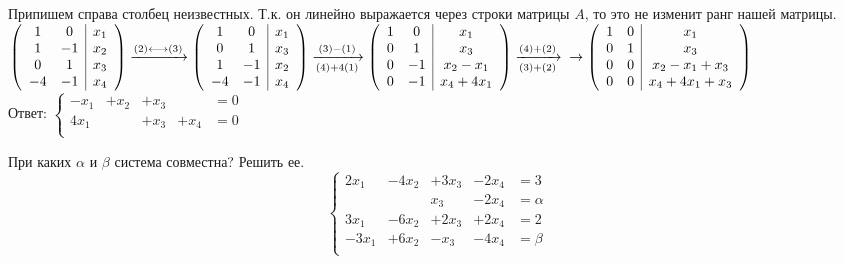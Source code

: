 \documentclass[a4paper,12pt]{article}
\newcounter{prim}
\newenvironment{prim}{%
	\addtocounter{prim}{1}
	\noindent{\\
	\textbf{\noindentПример \arabic{prim}\\}}%
	}{}
\begin{document}
Припишем справа столбец неизвестных. Т.к. он линейно выражается через строки матрицы $A$, то это не изменит ранг нашей матрицы.\\
$
\left( \begin{array}{cc|c}
1&0&x_1\\
1&-1&x_2\\
0&1&x_3\\
-4&-1&x_4\\
\end{array}\right)
\xrightarrow{(2)\longleftrightarrow(3)}
\left( \begin{array}{cc|c}
1&0&x_1\\
0&1&x_3\\
1&-1&x_2\\
-4&-1&x_4\\
\end{array}\right)
\xrightarrow[(4)+4(1)]{(3)-(1)}
\left( \begin{array}{cc|c}
1&0&x_1\\
0&1&x_3\\
0&-1&x_2-x_1\\
0&-1&x_4+4x_1\\
\end{array}\right)
\xrightarrow[(3)+(2)]{(4)+(2)}\\
\rightarrow
\left( \begin{array}{cc|c}
1&0&x_1\\
0&1&x_3\\
0&0&x_2-x_1+x_3\\
0&0&x_4+4x_1+x_3\\
\end{array}\right)
$\\
Ответ: $\left\{ \begin{array}{rrrrl}
	-x_1&+x_2&+x_3&&=0\\
	4x_1&&+x_3&+x_4&=0\\
\end{array}
\right.$
\begin{prim}
	При каких $\alpha$ и $\beta$ система совместна? Решить ее.
	$$\left\{ \begin{array}{rrrrl}
	2x_1&-4x_2&+3x_3&-2x_4&=3\\
	&&x_3&-2x_4&=\alpha\\
	3x_1&-6x_2&+2x_3&+2x_4&=2\\
	-3x_1&+6x_2&-x_3&-4x_4&=\beta\\
	\end{array}
	\right.$$
\end{prim}
\end{document}
